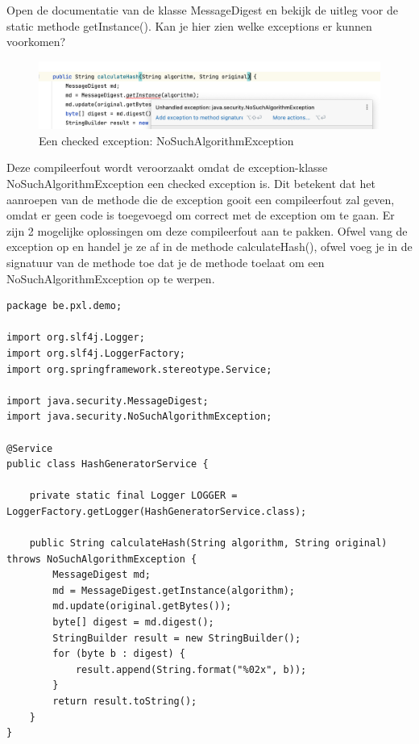 \begin{oefening}
Open de documentatie van de klasse MessageDigest en bekijk de uitleg voor de static methode getInstance(). Kan je hier zien welke exceptions er kunnen voorkomen?
\end{oefening}

\begin{figure}[H]
\includegraphics[width=\linewidth]{images/h2/no_such_algorithm_exception.png}
\caption{Een checked exception: NoSuchAlgorithmException}
\label{fig:no_such_algorithm}
\end{figure}

Deze compileerfout wordt veroorzaakt omdat de exception-klasse NoSuchAlgorithmException een checked exception is. Dit betekent dat het aanroepen van de methode die de exception gooit een compileerfout zal geven, omdat er geen code is toegevoegd om correct met de  exception om te gaan.
Er zijn 2 mogelijke oplossingen om deze compileerfout aan te pakken. Ofwel vang de exception op en handel je ze af in de methode calculateHash(), ofwel voeg je in de signatuur van de methode toe dat je de methode toelaat om een NoSuchAlgorithmException op te werpen. 

\begin{lstlisting}
package be.pxl.demo;

import org.slf4j.Logger;
import org.slf4j.LoggerFactory;
import org.springframework.stereotype.Service;

import java.security.MessageDigest;
import java.security.NoSuchAlgorithmException;

@Service
public class HashGeneratorService {

	private static final Logger LOGGER = LoggerFactory.getLogger(HashGeneratorService.class);

	public String calculateHash(String algorithm, String original) throws NoSuchAlgorithmException {
		MessageDigest md;
		md = MessageDigest.getInstance(algorithm);
		md.update(original.getBytes());
		byte[] digest = md.digest();
		StringBuilder result = new StringBuilder();
		for (byte b : digest) {
			result.append(String.format("%02x", b));
		}
		return result.toString();
	}
}
\end{lstlisting}

